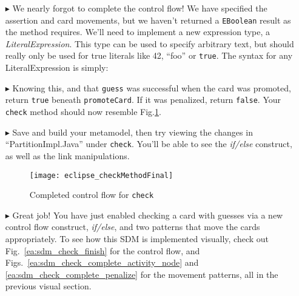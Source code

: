 \begin{itemize}
\item[$\blacktriangleright$] We nearly forgot to complete the control flow! We have specified the assertion and card movements, but we haven't returned a
\texttt{EBoolean} result as the method requires.  We'll need to implement a new expression type, a \emph{LiteralExpression}. This
type can be used to specify arbitrary text, but should really only be used for true literals like 42, ``foo'' or \texttt{true}. The syntax for any LiteralExpression
is simply:

\vspace{0.5cm}

\item[$\blacktriangleright$] Knowing this, and that \texttt{guess} was successful
when the card was promoted, return \texttt{true} beneath \texttt{promoteCard}. If it was penalized, return \texttt{false}. Your \texttt{check} method
should now resemble Fig.\ref{eclipse:finalMethod}.

\vspace{0.5cm}

\item[$\blacktriangleright$] Save and build your metamodel, then try viewing the changes in ``PartitionImpl.Java'' under \texttt{check}. You'll be able to
see the \emph{if/else} construct, as well as the link manipulations. 

\newpage

\begin{figure}[htbp]
\begin{center}
  \texttt{[image: eclipse\_checkMethodFinal]}
  \caption{Completed control flow for \texttt{check}}
  \label{eclipse:finalMethod}
\end{center}
\end{figure}

\item[$\blacktriangleright$] Great job! You have just enabled checking a card with guesses via a new control flow construct, \emph{if/else}, and two patterns
that move the cards appropriately. To see how this SDM is implemented visually, check out Fig.~\ref{ea:sdm_check_finish} for the control flow, and
Figs.~\ref{ea:sdm_check_complete_activity_node} and \ref{ea:sdm_check_complete_penalize} for the movement patterns, all in the previous visual section.

\end{itemize}
 